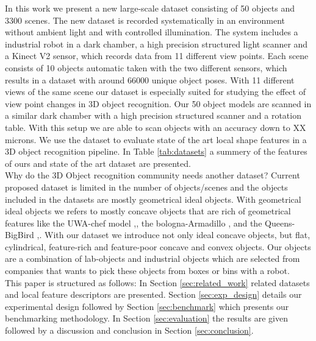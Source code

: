 \documentclass[10pt,twocolumn,letterpaper]{article}
\begin{document}
In this work we present a new large-scale dataset consisting of 50 objects and 3300 scenes. The new dataset is recorded systematically in an environment without ambient light and with controlled illumination. The system includes a industrial robot in a dark chamber, a high precision structured light scanner and a Kinect V2 sensor, which records data from 11 different view points. Each scene consists of 10 objects automatic taken with the two different sensors, which results in a dataset with around 66000 unique object poses. With 11 different views of the same scene our dataset is especially suited for studying the effect of view point changes in 3D object recognition. Our 50 object models are scanned in a similar dark chamber with a high precision structured scanner and a rotation table. With this setup we are able to scan objects with an accuracy down to XX microns. We use the dataset to evaluate state of the art local shape features in a 3D object recognition pipeline. In Table \ref{tab:datasets} a summery of the features of ours and state of the art dataset are presented.\\
Why do the 3D Object recognition community needs another dataset? Current proposed dataset is limited in the number of objects/scenes and the objects included in the datasets are mostly geometrical ideal objects. With geometrical ideal objects we refers to mostly concave objects that are rich of geometrical features like the UWA-chef model \cite{Mian2006},\cite{Mian2010}, the bologna-Armadillo \cite{Salti2014},\cite{Tombari2010} and the Queens-BigBird \cite{Taati2007},\cite{Taati2007}. With our dataset we introduce not only ideal concave objects, but flat, cylindrical, feature-rich and feature-poor concave and convex objects. Our objects are a combination of lab-objects and industrial objects which are selected from companies that wants to pick these objects from boxes or bins with a robot.\\
This paper is structured as follows: In Section \ref{sec:related_work} related datasets and local feature descriptors are presented. Section \ref{sec:exp_design} details our experimental design followed by Section \ref{sec:benchmark} which presents our benchmarking methodology. In Section \ref{sec:evaluation} the results are given followed by a discussion and conclusion in Section \ref{sec:conclusion}. 
\end{document}
